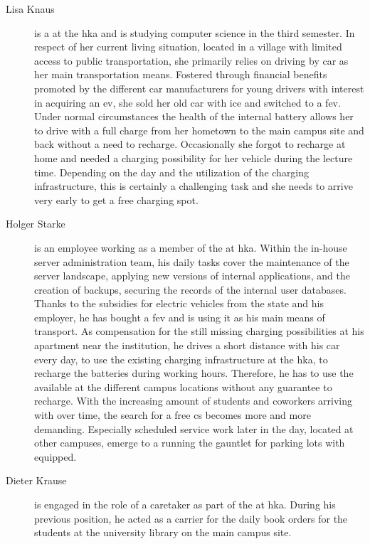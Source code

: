 \begin{description}
    \item[Lisa Knaus] is a  at the \acrshort{hka} and is studying computer science in the third semester. In respect of her current living situation, located in a village with limited access to public transportation, she primarily relies on driving by car as her main transportation means. 
    Fostered through financial benefits promoted by the different car manufacturers for young drivers with interest in acquiring an \acrshort{ev}, she sold her old car with \acrshort{ice} and switched to a \acrfull{fev}. 
    Under normal circumstances the health of the internal battery allows her to drive with a full charge from her hometown to the main campus site and back without a need to recharge. Occasionally she forgot to recharge at home and needed a charging possibility for her vehicle during the lecture time. Depending on the day and the utilization of the charging infrastructure, this is certainly a challenging task and she needs to arrive very early to get a free charging spot. 
    \item[Holger Starke] is an employee working as a member of the  at \acrshort{hka}. 
    Within the in-house server administration team, his daily tasks cover the maintenance of the server landscape, applying new versions of internal applications, and the creation of backups, securing the records of the internal user databases. 
    Thanks to the subsidies for electric vehicles from the state and his employer, he has bought a \acrshort{fev} and is using it as his main means of transport. 
    As compensation for the still missing charging possibilities at his apartment near the institution, he drives a short distance with his car every day, to use the existing charging infrastructure at the \acrshort{hka}, to recharge the batteries during working hours. 
    Therefore, he has to use the available  at the different campus locations without any guarantee to recharge. 
    With the increasing amount of students and coworkers arriving with  over time, the search for a free \acrshort{cs} becomes more and more demanding. 
    Especially scheduled service work later in the day, located at other campuses, emerge to a running the gauntlet for parking lots with  equipped. 
    \item[Dieter Krause] is engaged in the role of a caretaker as part of the  at \acrshort{hka}. During his previous position, he acted as a carrier for the daily book orders for the students at the university library on the main campus site. 

\end{description}
